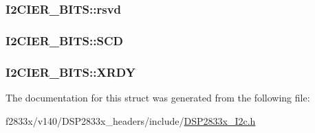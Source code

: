 \subsubsection[{rsvd}]{ I2\+C\+I\+E\+R\+\_\+\+B\+I\+T\+S\+::rsvd}\label{struct_i2_c_i_e_r___b_i_t_s_a232176eed3b43139da52140a3107345a}
\hypertarget{struct_i2_c_i_e_r___b_i_t_s_aaccd32a49a4fc8b5ffc7d871b623240d}{}
\subsubsection[{S\+C\+D}]{ I2\+C\+I\+E\+R\+\_\+\+B\+I\+T\+S\+::\+S\+C\+D}\label{struct_i2_c_i_e_r___b_i_t_s_aaccd32a49a4fc8b5ffc7d871b623240d}
\hypertarget{struct_i2_c_i_e_r___b_i_t_s_a21ae35a5bdb1cc156fc9ad9377e89082}{}
\subsubsection[{X\+R\+D\+Y}]{ I2\+C\+I\+E\+R\+\_\+\+B\+I\+T\+S\+::\+X\+R\+D\+Y}\label{struct_i2_c_i_e_r___b_i_t_s_a21ae35a5bdb1cc156fc9ad9377e89082}


The documentation for this struct was generated from the following file\+:\begin{DoxyCompactItemize}
\item 
f2833x/v140/\+D\+S\+P2833x\+\_\+headers/include/\hyperlink{_d_s_p2833x___i2c_8h}{D\+S\+P2833x\+\_\+\+I2c.\+h}\end{DoxyCompactItemize}
